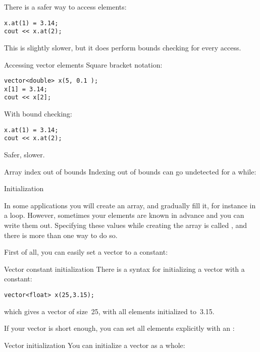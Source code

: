 There is a safer way to access elements:
\begin{lstlisting}
x.at(1) = 3.14;
cout << x.at(2);  
\end{lstlisting}
This is slightly slower, but it does perform bounds checking for every access.

\begin{slide}{Accessing vector elements}
  \label{sl:vectorsub}
  Square bracket notation:
\begin{lstlisting}
vector<double> x(5, 0.1 );
x[1] = 3.14;
cout << x[2];
\end{lstlisting}
With bound checking:
\begin{lstlisting}
x.at(1) = 3.14;
cout << x.at(2);
\end{lstlisting}
Safer, slower.
\end{slide}

\begin{block}{Array index out of bounds}
  Indexing out of bounds can go undetected for a while:
  
\end{block}

 {Initialization}

In some applications you will create an array, and gradually fill it,
for instance in a loop. However, sometimes your elements are known in
advance and you can write them out. Specifying these values while
creating the array is called , and
there is more than one way to do so.

First of all, you can easily set a vector to a constant:

\begin{block}{Vector constant initialization}
  \label{sl:vector-initconst}
  There is a syntax for initializing a vector with a constant:
\begin{lstlisting}
vector<float> x(25,3.15);
\end{lstlisting}
which gives a vector of size~25, with all elements initialized to~3.15.
\end{block}

If your vector is short enough, you can set all elements explicitly with an
:

\begin{block}{Vector initialization}
  \label{sl:vector-init}
  You can initialize a vector as a whole:
\end{block}

